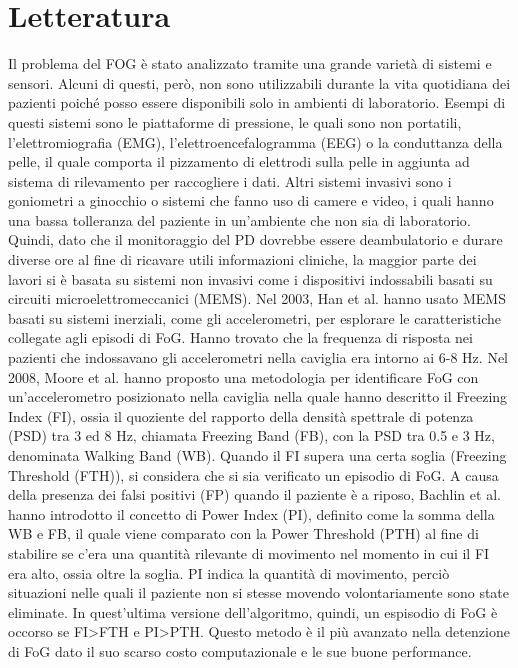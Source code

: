 

\chapter{Letteratura}\label{chap2:related}
Il problema del FOG è stato analizzato tramite una grande varietà di sistemi e sensori. Alcuni di questi, però, non sono utilizzabili durante la vita quotidiana dei pazienti poiché posso essere disponibili solo in ambienti di laboratorio. Esempi di questi sistemi sono le piattaforme di pressione\cite{38}, le quali sono non portatili, l'elettromiografia (EMG)\cite{25}, l'elettroencefalogramma (EEG)\cite{42} o la conduttanza della pelle\cite{43}, il quale comporta il pizzamento di elettrodi sulla pelle in aggiunta ad sistema di rilevamento per raccogliere i dati.
Altri sistemi invasivi sono i goniometri a ginocchio\cite{23} o sistemi che fanno uso di camere e video, i quali hanno una bassa tolleranza del paziente in un'ambiente che non sia di laboratorio\cite{23,39,44}. Quindi, dato che il monitoraggio del PD dovrebbe essere deambulatorio e  durare diverse ore al fine di ricavare utili informazioni cliniche\cite{34,45}, la maggior parte dei lavori si è basata su sistemi non invasivi come i dispositivi indossabili basati su circuiti microelettromeccanici (MEMS). \newline
Nel 2003, Han et al. hanno usato MEMS basati su sistemi inerziali, come gli accelerometri, per esplorare le caratteristiche collegate agli episodi di FoG. Hanno trovato che la frequenza di risposta nei pazienti che indossavano gli accelerometri nella caviglia era intorno ai 6-8 Hz\cite{19}. Nel 2008, Moore et al. hanno proposto una metodologia per identificare FoG con un'accelerometro posizionato nella caviglia nella quale hanno descritto il Freezing Index (FI), ossia il quoziente del rapporto della densità spettrale di potenza (PSD) tra 3 ed 8 Hz, chiamata Freezing Band (FB), con la PSD tra 0.5 e 3 Hz, denominata Walking Band (WB)\cite{21}. Quando il FI supera una certa soglia (Freezing Threshold (FTH)), si considera che si sia verificato un episodio di FoG. A causa della presenza dei falsi positivi (FP) quando il paziente è a riposo, Bachlin et al. hanno introdotto il concetto di Power Index (PI), definito come la somma della WB e FB, il quale viene comparato con la Power Threshold (PTH) al fine di stabilire se c'era una quantità rilevante di movimento nel momento in cui il FI era alto, ossia oltre la soglia\cite{21}. PI indica la quantità di movimento, perciò situazioni nelle quali il paziente non si stesse movendo volontariamente sono state eliminate. In quest'ultima versione dell'algoritmo, quindi, un espisodio di FoG è occorso se FI>FTH e PI>PTH. Questo metodo è il più avanzato nella detenzione di FoG dato il suo scarso costo computazionale e le sue buone performance\cite{22}. \newline
